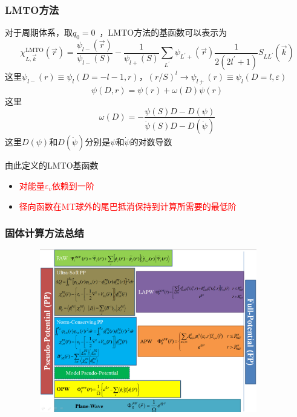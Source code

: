 \documentclass[cjk,slidestop,compress,mathserif,blue]{beamer}
\begin{document}
\frame
{
	\frametitle{\textrm{LMTO}方法}
	对于周期体系，取$q_0=0$~，\textrm{LMTO}方法的基函数可以表示为
	\begin{displaymath}
		\chi_{L,\vec k}^{\mathrm{LMTO}}(\vec r)=\dfrac{\psi_{l-}(\vec r)}{\psi_{l-}(S)}-\dfrac1{\psi_{l+}(S)}\sum_{L^{\prime}}\psi_{L^{\prime}+}(\vec r)\dfrac1{2(2l^{\prime}+1)}S_{LL^{\prime}}(\vec k)
	\end{displaymath}
	这里$\psi_{l-}(r)\equiv\psi_l(D=-l-1,r)$，$(r/S)^l\rightarrow\psi_{l+}(r)\equiv\psi_l(D=l,\varepsilon)$
	$$\psi(D,r)=\psi(r)+\omega(D)\dot\psi(r)$$
	这里
	$$\omega(D)=-\dfrac{\psi(S)D-D(\psi)}{\dot\psi(S)D-D(\dot\psi)}$$
	这里$D(\psi)$和$D(\dot\psi)$分别是$\psi$和$\dot\psi$的对数导数

	由此定义的\textrm{LMTO}基函数
	\begin{itemize}
		\item \textcolor{red}{对能量$\varepsilon_v$依赖到一阶}
		\item \textcolor{red}{径向函数在\textrm{MT}球外的尾巴抵消保持到计算所需要的最低阶}
	\end{itemize}
}

\frame
{
	\frametitle{固体计算方法总结}
\begin{figure}[h!]
\centering
\vspace*{-0.25in}
\includegraphics[height=2.80in,width=4.10in,viewport=0 0 1190 876,clip]{Figures/Pseudo-Full_Potential.png}
\label{Pseudo-Full_Poential}
\end{figure}
}
\end{document}
